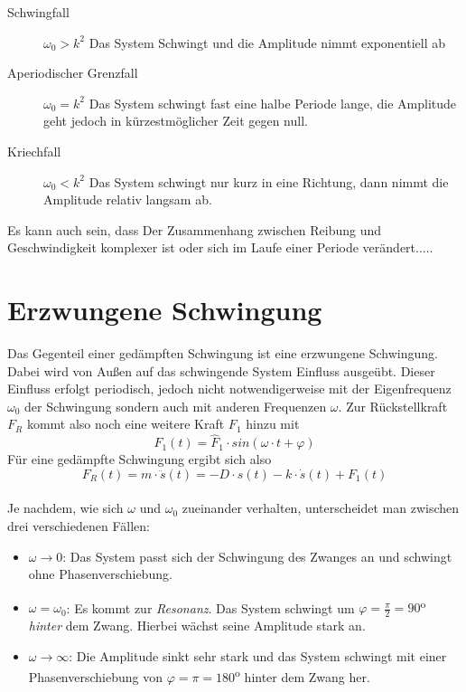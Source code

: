 \begin{description}
	\item[Schwingfall] \(\omega_0 > k^2\) Das System Schwingt und die Amplitude nimmt exponentiell ab
	\item[Aperiodischer Grenzfall] \(\omega_0 = k^2\) Das System schwingt fast eine halbe Periode lange, die Amplitude geht jedoch in kürzestmöglicher Zeit gegen null.
	\item[Kriechfall] \(\omega_0 < k^2\) Das System schwingt nur kurz in eine Richtung, dann nimmt die Amplitude relativ langsam ab.
\end{description}
	Es kann auch sein, dass Der Zusammenhang zwischen Reibung und Geschwindigkeit komplexer ist oder sich im Laufe einer Periode verändert.....




		\chapter{Erzwungene Schwingung}

Das Gegenteil einer gedämpften Schwingung ist eine erzwungene Schwingung. Dabei wird von Außen auf das schwingende System Einfluss ausgeübt. Dieser Einfluss erfolgt periodisch, jedoch nicht notwendigerweise mit der Eigenfrequenz \(\omega_0\) der Schwingung sondern auch mit anderen Frequenzen \(\omega\). Zur Rückstellkraft \(F_R\) kommt also noch eine weitere Kraft \(F_1\) hinzu mit 
	\begin{equation}
		F_1(t) = \hat{F}_1 \cdot sin(\omega \cdot t + \varphi)
	\end{equation}
Für eine gedämpfte Schwingung ergibt sich also
	\begin{equation}
		F_R(t) = m \cdot \ddot{s}(t) = - D \cdot s(t) - k \cdot \dot{s}(t) + F_1(t)
	\end{equation}
\(~\)\\
Je nachdem, wie sich \(\omega\) und \(\omega_0\) zueinander verhalten, unterscheidet man zwischen drei verschiedenen Fällen:
	
	\begin{itemize}
	\item \(\omega \rightarrow 0\): Das System passt sich der Schwingung des Zwanges an und schwingt ohne Phasenverschiebung.
	\item \(\omega = \omega_0\): Es kommt zur \emph{Resonanz}. Das System schwingt um \(\varphi = \frac{\pi}{2} = 90\)\textsuperscript{o} \emph{hinter} dem Zwang. Hierbei wächst seine Amplitude stark an.
	\item \(\omega \rightarrow \infty\): Die Amplitude sinkt sehr stark und das System schwingt mit einer Phasenverschiebung von \(\varphi = \pi = 180\)\textsuperscript{o} hinter dem Zwang her.
	\end{itemize}
